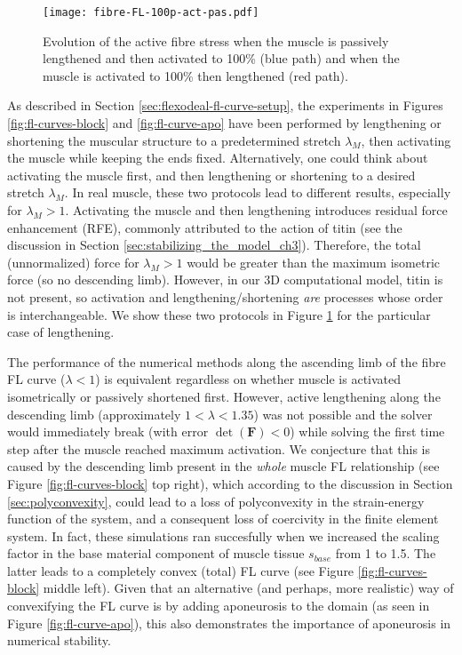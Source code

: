 \documentclass{sfuthesis}
\numberwithin{equation}{section}
\numberwithin{figure}{chapter}
\numberwithin{table}{chapter}
\theoremstyle{definition}
\def\*#1{{\mathbf{#1}}} %
\begin{document}
\begin{figure}
    \centering
    \texttt{[image: fibre-FL-100p-act-pas.pdf]}
    \caption{Evolution of the active fibre stress when the muscle is passively lengthened and then activated to 100\% (blue path) and when the muscle is activated to 100\% then lengthened (red path).
    \label{fig:act_len_len_act}}
\end{figure}

As described in Section \ref{sec:flexodeal-fl-curve-setup}, the experiments in Figures \ref{fig:fl-curves-block} and \ref{fig:fl-curve-apo} have been performed by lengthening or shortening the muscular structure to a predetermined stretch $\lambda_M$, then activating the muscle while keeping the ends fixed. Alternatively, one could think about activating the muscle first, and then lengthening or shortening to a desired stretch $\lambda_M$. In real muscle, these two protocols lead to different results, especially for $\lambda_M > 1$. Activating the muscle and then lengthening introduces residual force enhancement (RFE), commonly attributed to the action of titin (see the discussion in Section \ref{sec:stabilizing_the_model_ch3}). Therefore, the total (unnormalized) force for $\lambda_M > 1$ would be greater than the maximum isometric force (so no descending limb). However, in our 3D computational model, titin is not present, so activation and lengthening/shortening \textit{are} processes whose order is interchangeable. We show these two protocols in Figure \ref{fig:act_len_len_act} for the particular case of lengthening.

The performance of the numerical methods along the ascending limb of the fibre FL curve ($\lambda < 1$) is equivalent regardless on whether muscle is activated isometrically or passively shortened first. However, active lengthening along the descending limb (approximately $1 < \lambda < 1.35$) was not possible and the solver would immediately break (with error $\det(\*F) < 0$) while solving the first time step after the muscle reached maximum activation. We conjecture that this is caused by the descending limb present in the \textit{whole} muscle FL relationship (see Figure \ref{fig:fl-curves-block} top right), which according to the discussion in Section \ref{sec:polyconvexity}, could lead to a loss of polyconvexity in the strain-energy function of the system, and a consequent loss of coercivity in the finite element system. In fact, these simulations ran succesfully when we increased the scaling factor in the base material component of muscle tissue $s_{base}$ from 1 to 1.5. The latter leads to a completely convex (total) FL curve (see Figure \ref{fig:fl-curves-block} middle left). Given that an alternative (and perhaps, more realistic) way of convexifying the FL curve is by adding aponeurosis to the domain (as seen in Figure \ref{fig:fl-curve-apo}), this also demonstrates the importance of aponeurosis in numerical stability.
\end{document}

